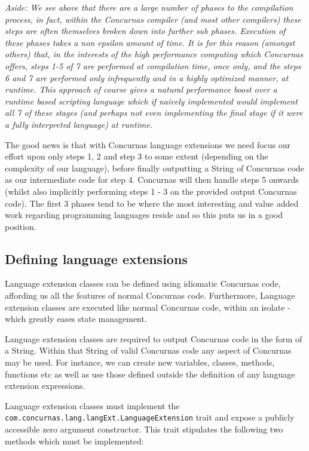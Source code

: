 \documentclass[conc-doc]{subfiles}
\begin{document}
\textit{Aside: We see above that there are a large number of phases to the compilation process, in fact, within the Concurnas compiler (and most other compilers) these steps are often themselves broken down into further sub phases. Execution of these phases takes a non epsilon amount of time. It is for this reason (amongst others) that, in the interests of the high performance computing which Concurnas offers, steps 1-5 of 7 are performed at compilation time, once only, and the steps 6 and 7 are performed only infrequently and in a highly optimized manner, at runtime. This approach of course gives a natural performance boost over a runtime based scripting language which if naively implemented would implement all 7 of these stages (and perhaps not even implementing the final stage if it were a fully interpreted language) at runtime.}

The good news is that with Concurnas language extensions we need focus our effort upon only steps 1, 2 and step 3 to some extent (depending on the complexity of our language), before finally outputting a String of Concurnas code as our intermediate code for step 4. Concurnas will then handle steps 5 onwards (whilst also implicitly performing steps 1 - 3 on the provided output Concurnas code). The first 3 phases tend to be where the most interesting and value added work regarding programming languages reside and so this puts us in a good position.

\subsection{Defining language extensions}
Language extension classes can be defined using idiomatic Concurnas code, affording us all the features of normal Concurnas code. Furthermore, Language extension classes are executed like normal Concurnas code, within an isolate - which greatly eases state management. 

Language extension classes are required to output Concurnas code in the form of a String. Within that String of valid Concurnas code any aspect of Concurnas may be used. For instance, we can create new variables, classes, methods, functions etc as well as use those defined outside the definition of any language extension expressions.

Language extension classes must implement the \lstinline{com.concurnas.lang.langExt.LanguageExtension} trait and expose a publicly accessible zero argument constructor. This trait stipulates the following two methods which must be implemented:
\end{document}
